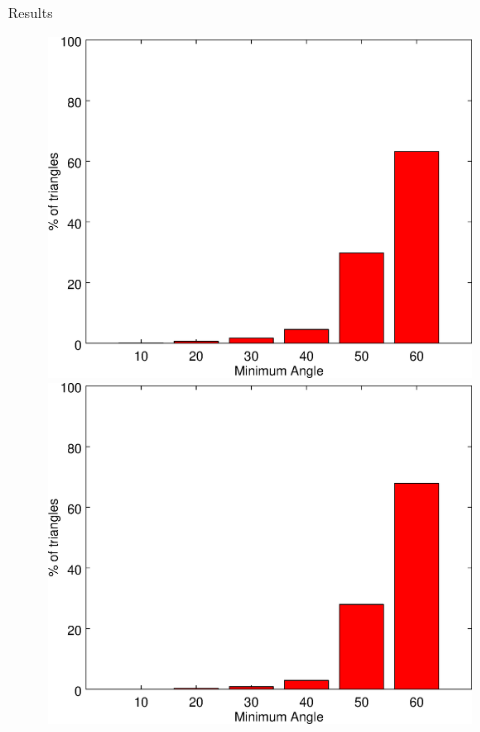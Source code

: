 \documentclass{beamer}
\begin{document}
\begin{frame}[plain]{Results}
\begin{figure}
\begin{minipage}{0.31\textwidth}
    \end{minipage}
    \begin{minipage}{.31\textwidth}
      \centering
      \includegraphics[width=1.0\linewidth]{../image/mp3.eps}
    \end{minipage} 
    \begin{minipage}{0.31\textwidth}
      \centering
      \includegraphics[width=1.0\linewidth]{../image/mp4.eps}
    \end{minipage}
    \begin{minipage}{.31\textwidth}
      \centering

\end{minipage}
\end{figure}
\end{frame}
\end{document}
